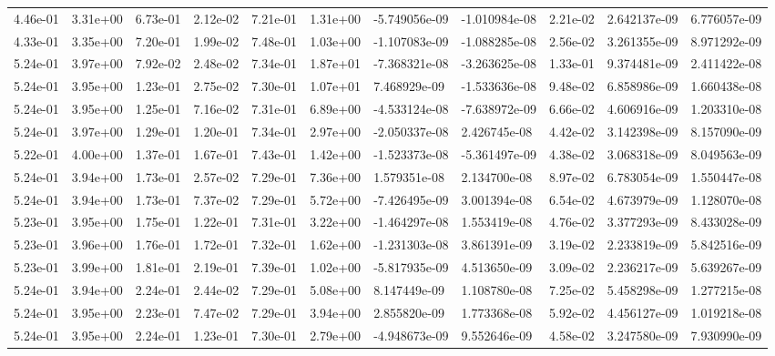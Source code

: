 \begin{longtable}{| p{} | p{} |}
4.46e-01 & 3.31e+00 & 6.73e-01 & 2.12e-02 & 7.21e-01 & 1.31e+00 & -5.749056e-09 & -1.010984e-08 &  2.21e-02 &  2.642137e-09 &  6.776057e-09 \\
4.33e-01 & 3.35e+00 & 7.20e-01 & 1.99e-02 & 7.48e-01 & 1.03e+00 & -1.107083e-09 & -1.088285e-08 &  2.56e-02 &  3.261355e-09 &  8.971292e-09 \\
5.24e-01 & 3.97e+00 & 7.92e-02 & 2.48e-02 & 7.34e-01 & 1.87e+01 & -7.368321e-08 & -3.263625e-08 &  1.33e-01 &  9.374481e-09 &  2.411422e-08 \\
5.24e-01 & 3.95e+00 & 1.23e-01 & 2.75e-02 & 7.30e-01 & 1.07e+01 &  7.468929e-09 & -1.533636e-08 &  9.48e-02 &  6.858986e-09 &  1.660438e-08 \\
5.24e-01 & 3.95e+00 & 1.25e-01 & 7.16e-02 & 7.31e-01 & 6.89e+00 & -4.533124e-08 & -7.638972e-09 &  6.66e-02 &  4.606916e-09 &  1.203310e-08 \\
5.24e-01 & 3.97e+00 & 1.29e-01 & 1.20e-01 & 7.34e-01 & 2.97e+00 & -2.050337e-08 &  2.426745e-08 &  4.42e-02 &  3.142398e-09 &  8.157090e-09 \\
5.22e-01 & 4.00e+00 & 1.37e-01 & 1.67e-01 & 7.43e-01 & 1.42e+00 & -1.523373e-08 & -5.361497e-09 &  4.38e-02 &  3.068318e-09 &  8.049563e-09 \\
5.24e-01 & 3.94e+00 & 1.73e-01 & 2.57e-02 & 7.29e-01 & 7.36e+00 &  1.579351e-08 &  2.134700e-08 &  8.97e-02 &  6.783054e-09 &  1.550447e-08 \\
5.24e-01 & 3.94e+00 & 1.73e-01 & 7.37e-02 & 7.29e-01 & 5.72e+00 & -7.426495e-09 &  3.001394e-08 &  6.54e-02 &  4.673979e-09 &  1.128070e-08 \\
5.23e-01 & 3.95e+00 & 1.75e-01 & 1.22e-01 & 7.31e-01 & 3.22e+00 & -1.464297e-08 &  1.553419e-08 &  4.76e-02 &  3.377293e-09 &  8.433028e-09 \\
5.23e-01 & 3.96e+00 & 1.76e-01 & 1.72e-01 & 7.32e-01 & 1.62e+00 & -1.231303e-08 &  3.861391e-09 &  3.19e-02 &  2.233819e-09 &  5.842516e-09 \\
5.23e-01 & 3.99e+00 & 1.81e-01 & 2.19e-01 & 7.39e-01 & 1.02e+00 & -5.817935e-09 &  4.513650e-09 &  3.09e-02 &  2.236217e-09 &  5.639267e-09 \\
5.24e-01 & 3.94e+00 & 2.24e-01 & 2.44e-02 & 7.29e-01 & 5.08e+00 &  8.147449e-09 &  1.108780e-08 &  7.25e-02 &  5.458298e-09 &  1.277215e-08 \\
5.24e-01 & 3.95e+00 & 2.23e-01 & 7.47e-02 & 7.29e-01 & 3.94e+00 &  2.855820e-09 &  1.773368e-08 &  5.92e-02 &  4.456127e-09 &  1.019218e-08 \\
5.24e-01 & 3.95e+00 & 2.24e-01 & 1.23e-01 & 7.30e-01 & 2.79e+00 & -4.948673e-09 &  9.552646e-09 &  4.58e-02 &  3.247580e-09 &  7.930990e-09 \\

\end{longtable}
